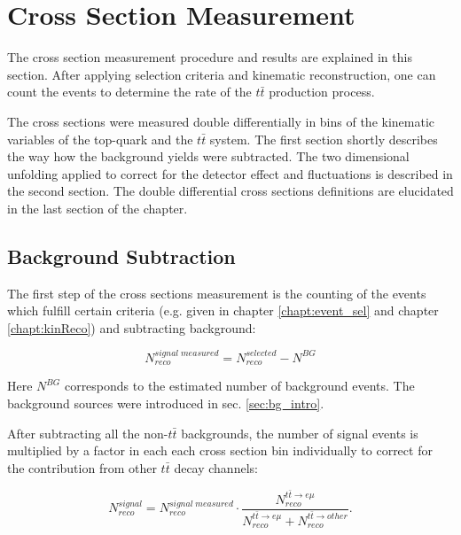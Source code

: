 \chapter{Cross Section Measurement}\label{chapt:xsec}

The cross section measurement procedure and results are explained in this section.
After applying selection criteria and kinematic reconstruction, one can count the events to determine
the rate of the $t\bar{t}$ production process.

The cross sections were measured double differentially in bins of the kinematic variables of the top-quark and the $t\bar{t}$ system.
The first section shortly describes the way how the background yields were subtracted.
The two dimensional unfolding applied to correct for the detector effect and fluctuations is described
in the second section.
The double differential cross sections definitions are elucidated in the last section of the chapter.

\section{Background Subtraction}
The first step of the cross sections measurement is the counting of the events which fulfill certain criteria (e.g. given in 
chapter \ref{chapt:event_sel} and chapter \ref{chapt:kinReco}) and subtracting background: 

\begin{equation}\label{eq:bgsub}
 N^{signal\;measured}_{reco} = N^{selected}_{reco} - N^{BG}
\end{equation}

Here $N^{BG}$ corresponds to the estimated number of background events. The background sources were introduced in sec. \ref{sec:bg_intro}.

After subtracting all the non-$t\bar{t}$ backgrounds, the number of signal events is multiplied by a factor in each each cross section bin
individually to correct for the contribution from other $t\bar{t}$ decay channels:

\begin{equation}\label{eq:bgsub}
 N^{signal}_{reco} = N^{signal\;measured}_{reco} \cdot \frac{N^{t\bar{t} \rightarrow e\mu}_{reco}}{N^{t\bar{t} \rightarrow e\mu}_{reco} + N^{t\bar{t} \rightarrow other}_{reco}}.
\end{equation}


